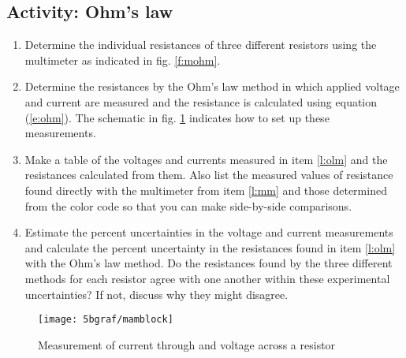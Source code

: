 \subsection{Activity: Ohm's law} \label{s:ohmlaw}
\begin{enumerate}
	\item \label{l:mm} Determine the individual resistances of three different resistors using the multimeter as indicated in fig. \ref{f:mohm}.
	
	\item \label{l:olm}Determine the resistances by the Ohm's law method in which applied voltage and current are measured and the resistance is calculated using equation (\ref{e:ohm}).  The schematic in fig. \ref{f:mamblock} indicates how to set up these measurements.

	\item Make a table of the voltages and currents measured in item \ref{l:olm} and the resistances calculated from them.  Also list the measured values of resistance found directly with the multimeter from item \ref{l:mm} and those determined from the color code so that you can make side-by-side comparisons.

	\item Estimate the percent uncertainties in the voltage and current measurements and calculate the percent uncertainty in the resistances found in item \ref{l:olm} with the Ohm's law method.  Do the resistances found by the three different methods for each resistor agree with one another within these experimental uncertainties? If not, discuss why they might disagree.
	
\end{enumerate}

\begin{figure}[htb]
	\centering
	\texttt{[image: 5bgraf/mamblock]} %
	\caption{Measurement of current through and voltage across a resistor}
	\label{f:mamblock} %
\end{figure}

